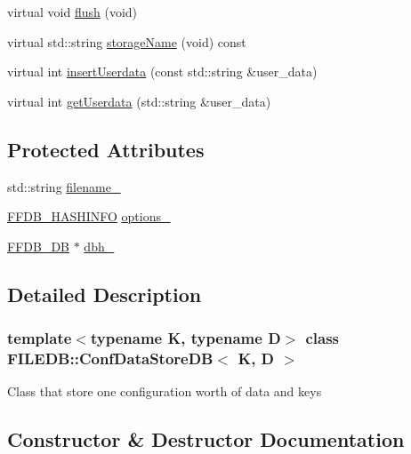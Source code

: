 \begin{DoxyCompactItemize}
virtual void \mbox{\hyperlink{classFILEDB_1_1ConfDataStoreDB_a982ae3b2108acbf75ab15a939fc7871b}{flush}} (void)
\item 
virtual std\+::string \mbox{\hyperlink{classFILEDB_1_1ConfDataStoreDB_acac74e3143398de6c5da068f37a762ee}{storage\+Name}} (void) const
\item 
virtual int \mbox{\hyperlink{classFILEDB_1_1ConfDataStoreDB_a8fa05198f3ff1f405fbdfc6a51f43d1a}{insert\+Userdata}} (const std\+::string \&user\+\_\+data)
\item 
virtual int \mbox{\hyperlink{classFILEDB_1_1ConfDataStoreDB_abf7ce0847e1d68f960836826d68c0079}{get\+Userdata}} (std\+::string \&user\+\_\+data)
\end{DoxyCompactItemize}
\subsection*{Protected Attributes}
\begin{DoxyCompactItemize}
\item 
std\+::string \mbox{\hyperlink{classFILEDB_1_1ConfDataStoreDB_a05dc0142a79f69fdc6dfa3cf50beea15}{filename\+\_\+}}
\item 
\mbox{\hyperlink{structFFDB__HASHINFO}{F\+F\+D\+B\+\_\+\+H\+A\+S\+H\+I\+N\+FO}} \mbox{\hyperlink{classFILEDB_1_1ConfDataStoreDB_a0969c71741392e7f0a151226e05fada2}{options\+\_\+}}
\item 
\mbox{\hyperlink{other__libs_2filedb_2filehash_2ffdb__db_8h_a0b27b956926453a7a8141ea8e10f0df8}{F\+F\+D\+B\+\_\+\+DB}} $\ast$ \mbox{\hyperlink{classFILEDB_1_1ConfDataStoreDB_aa5e755cd462b3df8b2fcc74c78e9d90b}{dbh\+\_\+}}
\end{DoxyCompactItemize}


\subsection{Detailed Description}
\subsubsection*{template$<$typename K, typename D$>$\newline
class F\+I\+L\+E\+D\+B\+::\+Conf\+Data\+Store\+D\+B$<$ K, D $>$}

Class that store one configuration worth of data and keys 

\subsection{Constructor \& Destructor Documentation}
\mbox{\label{classFILEDB_1_1ConfDataStoreDB_a575d901daeccae08bcda5b2a60681e1b}} 
